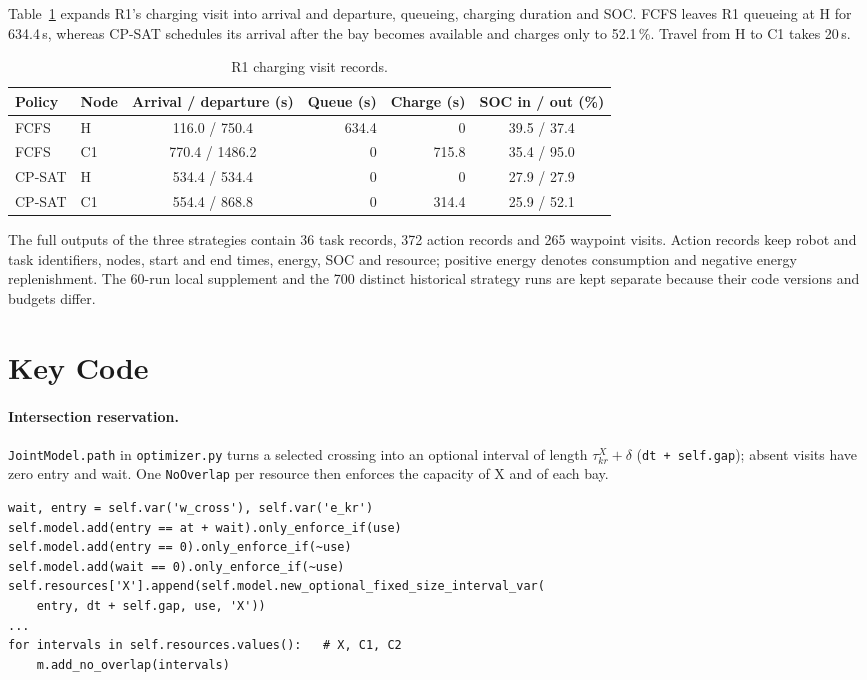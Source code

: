 \documentclass[11pt,a4paper]{article}
\newcommand{\code}[1]{\texttt{#1}}
\newcommand{\pct}{\,\%}
\begin{document}
Table~\ref{tab:r1charge} expands R1's charging visit into arrival and departure, queueing, charging
duration and SOC. FCFS leaves R1 queueing at H for 634.4\,s, whereas CP-SAT schedules its arrival after
the bay becomes available and charges only to 52.1\pct. Travel from H to C1 takes 20\,s.

\begin{table}[!htbp]
\centering\small
\caption{R1 charging visit records.}
\label{tab:r1charge}
\begin{tabular}{llcrrc}
\toprule
Policy & Node & Arrival / departure (s) & Queue (s) & Charge (s) & SOC in / out (\%) \\
\midrule
FCFS & H & 116.0 / 750.4 & 634.4 & 0 & 39.5 / 37.4 \\
FCFS & C1 & 770.4 / 1486.2 & 0 & 715.8 & 35.4 / 95.0 \\
CP-SAT & H & 534.4 / 534.4 & 0 & 0 & 27.9 / 27.9 \\
CP-SAT & C1 & 554.4 / 868.8 & 0 & 314.4 & 25.9 / 52.1 \\
\bottomrule
\end{tabular}
\end{table}

The full outputs of the three strategies contain 36 task records, 372 action records and 265 waypoint
visits. Action records keep robot and task identifiers, nodes, start and end times, energy, SOC and
resource; positive energy denotes consumption and negative energy replenishment. The 60-run local
supplement and the 700 distinct historical strategy runs are kept separate because their code versions
and budgets differ.

\section{Key Code}
\label{app:code}

\paragraph{Intersection reservation.} \code{JointModel.path} in \code{optimizer.py} turns a selected
crossing into an optional interval of length $\tau^{X}_{kr} + \delta$ (\code{dt + self.gap}); absent visits
have zero entry and wait. One \code{NoOverlap} per resource then enforces the capacity of X and of each
bay.
\begin{lstlisting}
wait, entry = self.var('w_cross'), self.var('e_kr')
self.model.add(entry == at + wait).only_enforce_if(use)
self.model.add(entry == 0).only_enforce_if(~use)
self.model.add(wait == 0).only_enforce_if(~use)
self.resources['X'].append(self.model.new_optional_fixed_size_interval_var(
    entry, dt + self.gap, use, 'X'))
...
for intervals in self.resources.values():   # X, C1, C2
    m.add_no_overlap(intervals)
\end{lstlisting}
\end{document}
